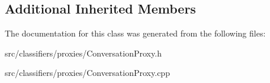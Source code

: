 \subsection*{Additional Inherited Members}


The documentation for this class was generated from the following files\+:\begin{DoxyCompactItemize}
\item 
src/classifiers/proxies/Conversation\+Proxy.\+h\item 
src/classifiers/proxies/Conversation\+Proxy.\+cpp\end{DoxyCompactItemize}
